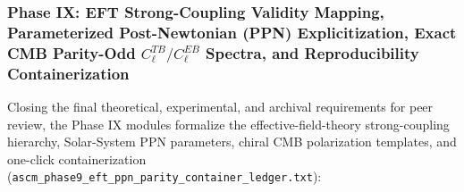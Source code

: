 \documentclass[aps,prd,onecolumn,superscriptaddress,nofootinbib,longbibliography,10pt]{revtex4-2}
\begin{document}
\begin{enumerate}
\end{enumerate}




\subsubsection*{Phase IX: EFT Strong-Coupling Validity Mapping, Parameterized Post-Newtonian (PPN) Explicitization, Exact CMB Parity-Odd \(C_\ell^{TB}/C_\ell^{EB}\) Spectra, and Reproducibility Containerization}

Closing the final theoretical, experimental, and archival requirements for peer review, the Phase IX modules formalize the effective-field-theory strong-coupling hierarchy, Solar-System PPN parameters, chiral CMB polarization templates, and one-click containerization (\texttt{ascm_phase9_eft_ppn_parity_container_ledger.txt}):
\end{document}
